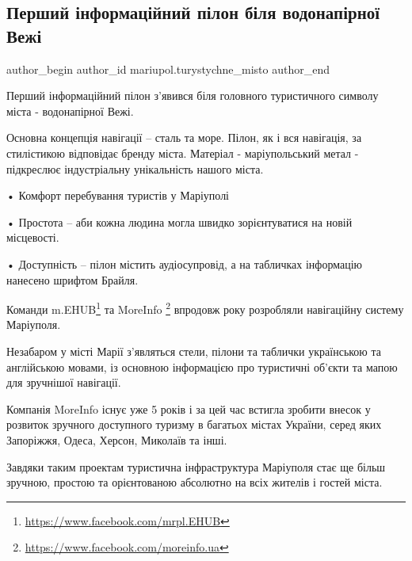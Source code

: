  
 
 
 
 

\subsection{Перший інформаційний пілон біля водонапірної Вежі}
\label{sec:14_01_2022.fb.mariupol.turystychne_misto.1.pershyj_informacijnyj_pilon_vezha}

\ifcmt
 author_begin
   author_id mariupol.turystychne_misto
 author_end
\fi

Перший інформаційний пілон з'явився біля головного туристичного символу міста -
водонапірної Вежі. 

Основна концепція навігації – сталь та море. Пілон, як і вся навігація, за
стилістикою відповідає бренду міста.  Матеріал - маріупольський метал  -
підкреслює індустріальну унікальність нашого міста. 

• Комфорт  перебування туристів у Маріуполі 

• Простота – аби кожна людина могла швидко зорієнтуватися на новій місцевості. 

• Доступність – пілон містить аудіосупровід, а на табличках інформацію нанесено
шрифтом Брайля.

Команди m.EHUB\footnote{\url{https://www.facebook.com/mrpl.EHUB}} та MoreInfo
\footnote{\url{https://www.facebook.com/moreinfo.ua}} впродовж року розробляли
навігаційну систему Маріуполя.


Незабаром у місті Марії з'являться стели, пілони та таблички українською та
англійською мовами, із основною інформацією про туристичні об'єкти та мапою для
зручнішої навігації. 

Компанія MoreInfo  існує уже 5 років і за цей час встигла зробити внесок у
розвиток зручного доступного туризму в багатьох містах України, серед яких
Запоріжжя, Одеса, Херсон, Миколаїв та інші.

Завдяки таким проектам туристична інфраструктура Маріуполя стає ще більш
зручною, простою та орієнтованою абсолютно на всіх жителів і гостей міста.
